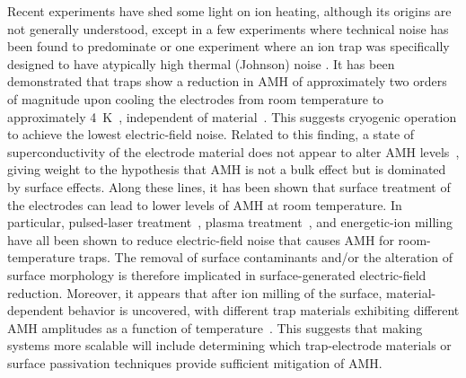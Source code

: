 \documentclass[%
reprint,
 amsmath,amssymb,
]{revtex4-1}
\begin{document}
Recent experiments have shed some light on ion heating, although its origins are not generally understood, except in a few experiments where technical noise has been found to predominate \cite{brownnutt_2015} or one experiment where an ion trap was specifically designed to have atypically high thermal (Johnson) noise \cite{innsbruck_first_time_2018}.  It has been demonstrated that  traps show a reduction in AMH of approximately two orders of magnitude upon cooling the electrodes from room temperature to approximately 4~K~\cite{PhysRevLett.100.013001_2008_1,PhysRevA.91.041402_2015}, independent of material~\cite{PhysRevA.89.012318_2014}.  This suggests cryogenic operation to achieve the lowest electric-field noise.  Related to this finding, a state of superconductivity of the electrode material does not appear to alter AMH levels~\cite{Chuang_SC_trap_2010,PhysRevA.89.012318_2014}, giving weight to the hypothesis that AMH is not a bulk effect but is dominated by surface effects.  Along these lines, it has been shown that surface treatment of the electrodes can lead to lower levels of AMH at room temperature.  In particular, pulsed-laser treatment~\cite{laser_cleaning_2011}, plasma treatment~\cite{PhysRevA.92.020302_2015}, and energetic-ion milling~\cite{PhysRevLett.109.103001_2012,PhysRevB.89.245435_2014,NIST_Ne_2014,sedlacek_milling_2018} have all been shown to reduce electric-field noise that causes AMH for room-temperature traps.  The removal of surface contaminants and/or the alteration of surface morphology is therefore implicated in surface-generated electric-field reduction.  Moreover, it appears that after ion milling of the surface, material-dependent behavior is uncovered, with different trap materials exhibiting different AMH amplitudes as a function of temperature~\cite{sedlacek_milling_2018}.  This suggests that making systems more scalable will include determining which trap-electrode materials or surface passivation techniques provide sufficient mitigation of AMH.
\end{document}
